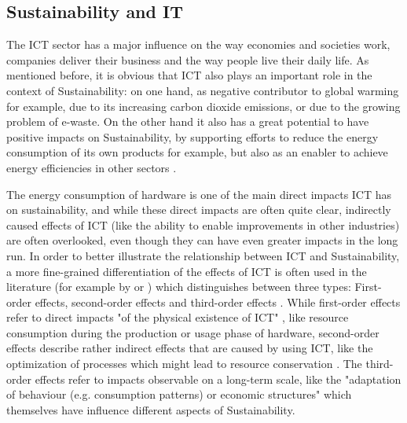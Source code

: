 \documentclass[oribibl]{llncs}
\begin{document}

\subsection{Sustainability and IT}
The ICT sector has a major influence on the way economies and societies work, companies deliver their business and the way people live their daily life. As mentioned before, it is obvious that ICT also plays an important role in the context of Sustainability: on one hand, as negative contributor to global warming for example, due to its increasing carbon dioxide emissions, %
or due to the growing problem of e-waste. %
On the other hand it also has a great potential to have positive impacts on Sustainability, by supporting efforts to reduce the energy consumption of its own products for example, but also as an enabler to achieve energy efficiencies in other sectors \cite{smart2020}. %

The energy consumption of hardware is one of the main direct impacts ICT has on sustainability, and while these direct impacts are often quite clear, indirectly caused effects of ICT (like the ability to enable improvements in other industries) are often overlooked, even though they can have even greater impacts in the long run. In order to better illustrate the relationship between ICT and Sustainability, a more fine-grained differentiation of the effects of ICT is often used in the literature (for example by \cite{hilty_relevance_2006} or \cite{naumann_greensoft_2011}) which distinguishes between three types: First-order effects, second-order effects and third-order effects \cite{berkhout_impacts_2001}. %
While first-order effects refer to direct impacts "of the physical existence of ICT" \cite{hilty_relevance_2006}, like resource consumption during the production or usage phase of hardware, second-order effects describe rather indirect effects that are caused by using ICT, like the optimization of processes which might lead to resource conservation \cite{naumann_greensoft_2011}. The third-order effects refer to impacts observable on a long-term scale, like the "adaptation of behaviour (e.g. consumption patterns) or economic structures" \cite{hilty_relevance_2006} which themselves have influence different aspects of Sustainability.  %
\end{document}
